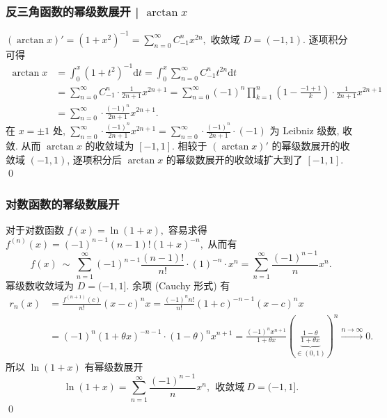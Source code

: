 \begin{frame}
\frametitle{反三角函数的幂级数展开 | $\arctan x$}

$(\arctan x)' = (1 + x^2)^{-1} = \sum_{n=0}^\infty C_{-1}^n x^{2n},$ 收敛域 $D = (-1, 1)$. 逐项积分可得
\begin{align*}
\arctan x & = \int_0^x (1 + t^2)^{-1} \mathrm{d}t = \int_0^x \sum_{n=0}^\infty C_{-1}^n t^{2n} \mathrm{d}t \\
& = \sum_{n=0}^\infty C_{-1}^n \cdot \frac{1}{2n+1} x^{2n+1} = \sum_{n=0}^\infty (-1)^n \prod_{k=1}^n \left( 1 - \frac{-1+1}{k} \right) \cdot \frac{1}{2n+1} x^{2n+1} \\
& = \sum_{n=0}^\infty \cdot \frac{(-1)^n}{2n+1} x^{2n+1}.
\end{align*}
在 $x = \pm 1$ 处, $\sum_{n=0}^\infty \cdot \frac{(-1)^n}{2n+1} x^{2n+1} = \sum_{n=0}^\infty \cdot \frac{(-1)^n}{2n+1} \cdot (-1)$ 为 Leibniz 级数, 收敛. 从而 $\arctan x$ 的收敛域为 $[-1, 1]$.
\pause
相较于 $(\arctan x)'$ 的幂级数展开的收敛域 $(-1, 1)$, 逐项积分后 $\arctan x$ 的幂级数展开的收敛域扩大到了 $[-1, 1]$.
\qed

\end{frame}


\begin{frame}
\frametitle{对数函数的幂级数展开}

对于对数函数 $f(x) = \ln (1 + x),$ 容易求得 $f^{(n)}(x) = (-1)^{n-1} (n-1)! (1 + x)^{-n},$ 从而有
\[
f(x) ~ \sim ~ \sum_{n=1}^\infty (-1)^{n-1} \frac{(n-1)!}{n!} \cdot (1)^{-n} \cdot x^n = \sum_{n=1}^\infty \frac{(-1)^{n-1}}{n} x^n.
\]
幂级数收敛域为 $D = (-1, 1]$. 余项 (Cauchy 形式) 有
\begin{align*}
r_n(x) & = \frac{f^{(n+1)}(c)}{n!} (x - c)^n x = \frac{(-1)^n n!}{n!} (1 + c)^{-n-1} (x - c)^n x \\
& = (-1)^n (1 + \theta x)^{-n-1} \cdot (1 - \theta)^n x^{n+1} = \frac{(-1)^n x^{n+1}}{1 + \theta x} \left( \underbrace{\frac{1 - \theta}{1 + \theta x}}_{\in (0, 1)} \right)^n \xrightarrow{n \to \infty} 0.
\end{align*}
所以 $\ln (1 + x)$ 有幂级数展开
\[
\ln (1 + x) = \sum_{n=1}^\infty \frac{(-1)^{n-1}}{n} x^n, ~~ \text{收敛域} ~ D = (-1, 1].
\]
\qed

\end{frame}


